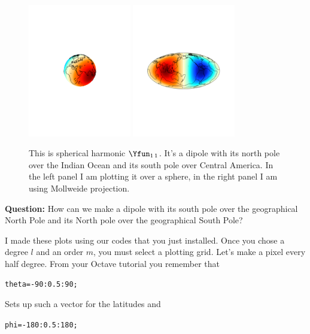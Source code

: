 \documentclass[11pt]{article}
\begin{document}
 \begin{figure}[h!]
\centering
\includegraphics[width=0.4\textwidth,trim = 7cm 10cm 7cm 10cm, clip]{figures/Y11}
\includegraphics[width=0.4\textwidth,trim = 3cm 9cm 3cm 10cm, clip]{figures/Y11_Mol}
\caption{This is spherical harmonic $\Yfun_{1\,1}$. It's a dipole with its north pole over the Indian Ocean and its south pole over Central America. In the left panel I am plotting it over a sphere, in the right panel I am using Mollweide projection.}
\label{Y11fig}
\end{figure}
 
 \textbf{Question:} How can we make a dipole with its south pole over the geographical North Pole and its North pole over the geographical South Pole?
 
 
 I made these plots using our codes that you just installed. Once you chose a degree $l$ and an order $m$, you must select a plotting grid. Let's make a pixel every half degree. From your Octave tutorial you remember that 
  
\qquad \verb+theta=-90:0.5:90;+

Sets up such a vector for the latitudes and 

\qquad \verb+phi=-180:0.5:180;+
\end{document}
